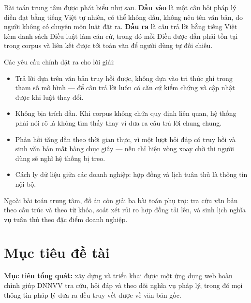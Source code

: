 \documentclass[12pt,a4paper]{report}
\numberwithin{equation}{chapter}
\numberwithin{figure}{chapter}
\numberwithin{table}{chapter}
\begin{document}
Bài toán trung tâm được phát biểu như sau. \textbf{Đầu vào} là một câu hỏi pháp
lý diễn đạt bằng tiếng Việt tự nhiên, có thể không dấu, không nêu tên văn bản, do
người không có chuyên môn luật đặt ra. \textbf{Đầu ra} là câu trả lời bằng tiếng
Việt kèm danh sách Điều luật làm căn cứ, trong đó mỗi Điều được dẫn phải tồn tại
trong corpus và liên kết được tới toàn văn để người dùng tự đối chiếu.

Các yêu cầu chính đặt ra cho lời giải:

\begin{itemize}
    \item Trả lời dựa trên văn bản truy hồi được, không dựa vào tri thức ghi
    trong tham số mô hình --- để câu trả lời luôn có căn cứ kiểm chứng và cập
    nhật được khi luật thay đổi.
    \item Không bịa trích dẫn. Khi corpus không chứa quy định liên quan, hệ thống
    phải nói rõ là không tìm thấy thay vì đưa ra câu trả lời chung chung.
    \item Phản hồi tăng dần theo thời gian thực, vì một lượt hỏi đáp có truy hồi
    và sinh văn bản mất hàng chục giây --- nếu chỉ hiện vòng xoay chờ thì người
    dùng sẽ nghĩ hệ thống bị treo.
    \item Cách ly dữ liệu giữa các doanh nghiệp: hợp đồng và lịch tuân thủ là
    thông tin nội bộ.
\end{itemize}

Ngoài bài toán trung tâm, đồ án còn giải ba bài toán phụ trợ: tra cứu văn bản
theo cấu trúc và theo từ khóa, soát xét rủi ro hợp đồng tải lên, và sinh lịch
nghĩa vụ tuân thủ theo đặc điểm doanh nghiệp.

\section{Mục tiêu đề tài}

\textbf{Mục tiêu tổng quát:} xây dựng và triển khai được một ứng dụng web hoàn
chỉnh giúp DNNVV tra cứu, hỏi đáp và theo dõi nghĩa vụ pháp lý, trong đó mọi
thông tin pháp lý đưa ra đều truy vết được về văn bản gốc.
\end{document}
